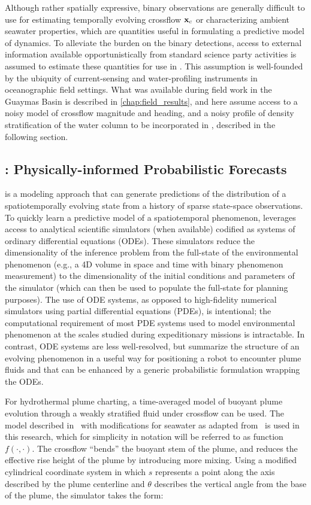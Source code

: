 Although rather spatially expressive, binary observations are generally difficult to use for estimating temporally evolving crossflow $\mathbf{x}_c$ or characterizing ambient seawater properties, which are quantities useful in formulating a predictive model of dynamics. To alleviate the burden on the binary detections, access to external information available opportunistically from standard science party activities is assumed to estimate these quantities for use in \PHUMES. This assumption is well-founded by the ubiquity of current-sensing and water-profiling instruments in oceanographic field settings. What was available during field work in the Guaymas Basin is described in \cref{chap:field_results}, and here assume access to a noisy model of crossflow magnitude and heading, and a noisy profile of density stratification of the water column to be incorporated in \PHUMES, described in the following section. 

\subsection{\PHUMES: Physically-informed Probabilistic Forecasts}
\label{sec:phumes}
\PHUMES is a modeling approach that can generate predictions of the distribution of a spatiotemporally evolving state from a history of sparse state-space observations. To quickly learn a predictive model of a spatiotemporal phenomenon, \PHUMES leverages access to analytical scientific simulators (when available) codified as systems of ordinary differential equations (ODEs). These simulators reduce the dimensionality of the inference problem from the full-state of the environmental phenomenon (e.g., a 4D volume in space and time with binary phenomenon measurement) to the dimensionality of the initial conditions and parameters of the simulator (which can then be used to populate the full-state for planning purposes). The use of ODE systems, as opposed to high-fidelity numerical simulators using partial differential equations (PDEs), is intentional; the computational requirement of most PDE systems used to model environmental phenomenon at the scales studied during expeditionary missions is intractable. In contrast, ODE systems are less well-resolved, but summarize the structure of an evolving phenomenon in a useful way for positioning a robot to encounter plume fluids and that can be enhanced by a generic probabilistic formulation wrapping the ODEs.

For hydrothermal plume charting, a time-averaged model of buoyant plume evolution through a weakly stratified fluid under crossflow can be used. The model described in~\cite{tohidi2016highly} with modifications for seawater as adapted from~\cite{xu2012deep} is used in this research, which for simplicity in notation will be referred to as function $f(\cdot, \cdot)$. The crossflow ``bends'' the buoyant stem of the plume, and reduces the effective rise height of the plume by introducing more mixing. Using a modified cylindrical coordinate system in which $s$ represents a point along the axis described by the plume centerline and $\theta$ describes the vertical angle from the base of the plume, the \PHUMES simulator takes the form:

